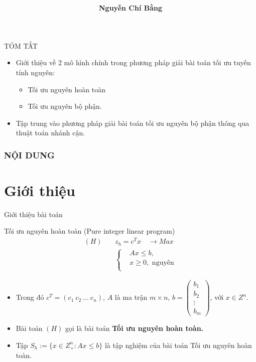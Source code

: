 \documentclass{beamer}
\title[]{\fontsize{13pt}{10pt}\selectfont {\bf \LARGE Phương pháp nhánh cận}\\}
\author[]{\bf Nguyễn Chí Bằng \\}
\begin{document}
\begin{frame}

\titlepage
\end{frame}

\begin{frame}{TÓM TẮT}
\begin{itemize}
\item Giới thiệu về 2 mô hình chính trong phương pháp giải bài toán tối ưu tuyến tính nguyên:
\begin{itemize}
\item Tối ưu nguyên hoàn toàn
\item Tối ưu nguyên bộ phận.
\end{itemize}
\item Tập trung vào phương pháp giải bài toán tối ưu nguyên bộ phận thông qua thuật toán nhánh cận.
\end{itemize}
\end{frame}

\begin{frame}
    \frametitle{NỘI DUNG}
    \tableofcontents
\end{frame}

\section{Giới thiệu}

\begin{frame}
   \center 
   \huge Giới thiệu bài toán 
\end{frame}

\begin{frame}{Tối ưu nguyên hoàn toàn (Pure integer linear program)}
    \begin{equation} \label{H}
        \begin{split}
        (H) \quad & z_h=c^Tx \quad \longrightarrow Max \\
                  & \left\{\begin{split}
                    &Ax \leq  b, \\
                    &x \geq 0, \text{ nguyên} \\
                    \end{split}\right.    
        \end{split}
        \end{equation}            
    \begin{itemize} \small
    \item Trong đó $c^T=(c_1 \: c_2 \: \ldots \: c_n)$, $A$ là ma trận $m\times n$, $b=\begin{pmatrix}
        b_1 \\
        b_2 \\
        \vdots \\
        b_m
        \end{pmatrix}$, với $x\in Z^n$.
    \item Bài toán $(H)$ gọi là bài toán \textbf{Tối ưu nguyên hoàn toàn.}
    \item Tập $S_h:=\{x\in Z^n_+: Ax\leq b\}$ là tập nghiệm của bài toán Tối ưu nguyên hoàn toàn.
    \end{itemize}
\end{frame}
\end{document}
